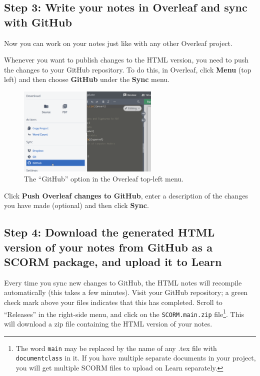 \subsection{Step 3: Write your notes in Overleaf and sync with GitHub}
\label{ssec:sync}

Now you can work on your notes just like with any other Overleaf project.

Whenever you want to publish changes to the HTML version, you need to push the changes to your GitHub repository. To do this, in Overleaf, click \textbf{Menu} (top left) and then choose \textbf{GitHub} under the \textbf{Sync} menu.

\begin{figure}[h]
    \centering
    \includegraphics[width=0.6\textwidth]{img/overleaf_sync.png}
    \caption{The ``GitHub'' option in the Overleaf top-left menu.}
    \label{fig:gh-overleaf-sync}
\end{figure}

Click \textbf{Push Overleaf changes to GitHub}, enter a description of the changes you have made (optional) and then click \textbf{Sync}.

\subsection{Step 4: Download the generated HTML version of your notes from GitHub as a SCORM package, and upload it to Learn}
\label{ssec:download}

Every time you sync new changes to GitHub, the HTML notes will recompile automatically (this takes a few minutes). Visit your GitHub repository; a green check mark above your files indicates that this has completed. Scroll to ``Releases'' in the right-side menu, and click on the \texttt{SCORM.main.zip} file\footnote{The word \texttt{main} may be replaced by the name of any .tex file with \texttt{documentclass} in it. If you have multiple separate documents in your project, you will get multiple SCORM files to upload on Learn separately.}. This will download a zip file containing the HTML version of your notes.


